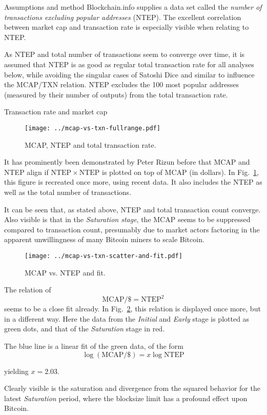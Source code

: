 \documentclass{article}
\begin{document}
\begin{section}{Assumptions and method}
  Blockchain.info supplies a data set called the \emph{number of transactions
    excluding popular addresses} (NTEP). The excellent correlation between
  market cap and transaction rate is especially visible when relating to NTEP.

  As NTEP and total number of transactions seem to converge over time, it is
  assumed that NTEP is as good as regular total transaction rate for all
  analyses below, while avoiding the singular cases of Satoshi Dice and
  similar to influence the MCAP/TXN relation. NTEP excludes the 100 most
  popular addresses (measured by their number of outputs) from the total
  transaction rate.
\clearpage
\end{section}
\begin{section}{Transaction rate and market cap}
  \begin{figure}[h]
    \texttt{[image: ../mcap-vs-txn-fullrange.pdf]}
    \caption{MCAP, NTEP and total transaction rate.\label{fig:mcap-vs-txn-fullrange}}
    \end{figure}
  It has prominently been demonstrated by Peter Rizun before that MCAP and NTEP
  align if $\mathrm{NTEP} \times \mathrm{NTEP}$ is plotted on top of MCAP (in
  dollars). In Fig.~\ref{fig:mcap-vs-txn-fullrange}, this figure is recreated
  once more, using recent data. It also includes the NTEP as well as the total
  number of transactions.

  It can be seen that, as stated above, NTEP and total transaction count
  converge.  Also visible is that in the \emph{Saturation stage}, the MCAP
  seems to be suppressed compared to transaction count, presumably due to
  market actors factoring in the apparent unwillingness of many Bitcoin miners
  to scale Bitcoin.

  \begin{figure}[h]
    \texttt{[image: ../mcap-vs-txn-scatter-and-fit.pdf]}
    \caption{MCAP vs. NTEP and fit.\label{fig:mcap-vs-txn-scatter-and-fit}}
  \end{figure}
  
  The relation of \begin{equation}
    \mathrm{MCAP / \$} = \mathrm{NTEP} ^ 2
    \end{equation}
  seems to be a close fit already. In
  Fig.~\ref{fig:mcap-vs-txn-scatter-and-fit}, this relation is displayed
  once more, but in a different way.  Here the data from the \emph{Initial}
  and \emph{Early} stage is plotted as green dots, and that of the
  \emph{Saturation} stage in red.

  The blue line is a linear fit of the green data, of the form
  \begin{equation}
  \log(\mathrm{MCAP / \$}) = x \log \mathrm{NTEP} 
  \end{equation}

  yielding $x=2.03$.

  Clearly visible is the saturation and divergence from the squared behavior
  for the latest \emph{Saturation} period, where the blocksize limit has a
  profound effect upon Bitcoin.

\clearpage
\end{section}
\end{document}
